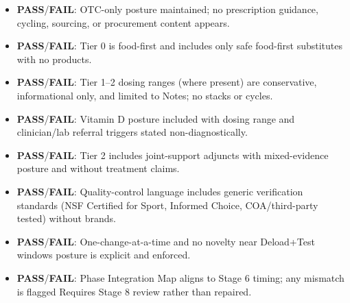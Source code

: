 \documentclass[10pt]{article}
\begin{document}
\begin{itemize}
\item \textbf{PASS}/\textbf{FAIL}: OTC-only posture maintained; no prescription guidance, cycling, sourcing, or procurement content appears.
\item \textbf{PASS}/\textbf{FAIL}: Tier 0 is food-first and includes only safe food-first substitutes with no products.
\item \textbf{PASS}/\textbf{FAIL}: Tier 1–2 dosing ranges (where present) are conservative, informational only, and limited to Notes; no stacks or cycles.
\item \textbf{PASS}/\textbf{FAIL}: Vitamin D posture included with dosing range and clinician/lab referral triggers stated non-diagnostically.
\item \textbf{PASS}/\textbf{FAIL}: Tier 2 includes joint-support adjuncts with mixed-evidence posture and without treatment claims.
\item \textbf{PASS}/\textbf{FAIL}: Quality-control language includes generic verification standards (NSF Certified for Sport, Informed Choice, COA/third-party tested) without brands.
\item \textbf{PASS}/\textbf{FAIL}: One-change-at-a-time and no novelty near Deload+Test windows posture is explicit and enforced.
\item \textbf{PASS}/\textbf{FAIL}: Phase Integration Map aligns to Stage 6 timing; any mismatch is flagged Requires Stage 8 review rather than repaired.
\end{itemize}
\end{document}
